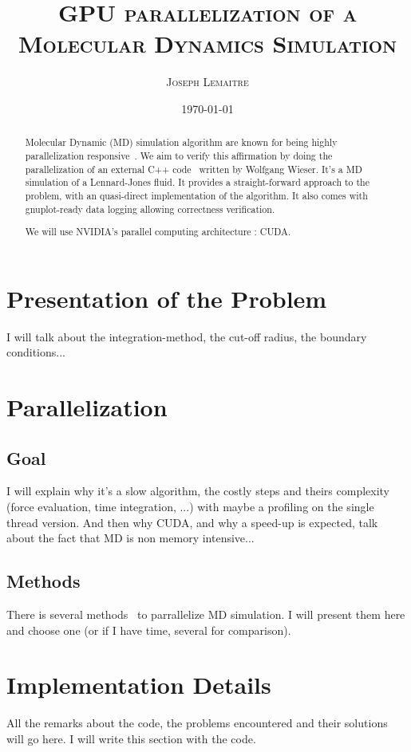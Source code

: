 \documentclass[a4wide,12pt]{article}
\date{\today}
\title{\textsc{GPU parallelization of a Molecular Dynamics Simulation}}
\author{\textsc{Joseph Lemaitre}}
\begin{document}
\maketitle

\begin{abstract}
Molecular Dynamic (MD) simulation algorithm are known for being highly parallelization responsive~\cite{walters}.
We aim to verify this affirmation by doing the parallelization of an 
external C++ code~\cite{ljfluid} written by 
Wolfgang Wieser. It's a MD simulation of a Lennard-Jones fluid. It provides
a straight-forward approach to the problem, with an quasi-direct implementation of the 
algorithm. It also comes with gnuplot-ready data logging allowing correctness verification.

We will use NVIDIA's parallel computing architecture : CUDA.

\end{abstract}

\section{Presentation of the Problem}
I will talk about the integration-method, the cut-off radius, the boundary conditions...

\section{Parallelization}
\subsection{Goal}
I will explain why it's a slow algorithm, the costly steps and theirs complexity (force evaluation, time integration, ...) with maybe a profiling on 
the single thread version. And then why CUDA, and why a speed-up is expected, talk about the fact that MD is non memory intensive...
\subsection{Methods}
There is several methods~\cite{plimpton} to parrallelize MD simulation. I will present them here and choose 
one (or if I have time, several for comparison).



\section{Implementation Details}
All the remarks about the code, the problems encountered and their solutions
will go here. I will write this section with the code.
\end{document}
